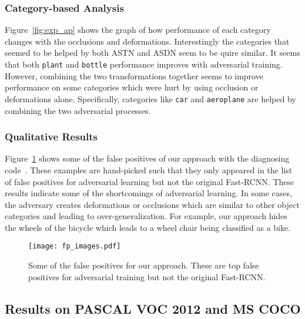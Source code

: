\documentclass[10pt,twocolumn,letterpaper]{article}
\begin{document}
\vspace{-0.1in}
\subsubsection{Category-based Analysis}
\vspace{-0.05in}
Figure~\ref{fig:exp_ap} shows the graph of how performance of each category changes with the occlusions and deformations. Interestingly the categories that seemed to be helped by both ASTN and ASDN seem to be quire similar. It seems that both {\tt plant} and {\tt bottle} performance improves with adversarial training. However, combining the two transformations together seems to improve performance on some categories which were hurt by using occlusion or deformations alone. Specifically, categories like {\tt car} and {\tt aeroplane} are helped by combining the two adversarial processes.



\subsubsection{Qualitative Results}
\vspace{-0.05in}
Figure~\ref{fig:exp_fp} shows some of the false positives of our approach with the diagnosing code~\cite{hoiem12}. These examples are hand-picked such that they only appeared in the list of false positives for adversarial learning but not the original Fast-RCNN. These results indicate some of the shortcomings of adversarial learning. In some cases, the adversary creates deformations or occlusions which are similar to other object categories and leading to over-generalization. For example, our approach hides the wheels of the bicycle which leads to a wheel chair being classified as a bike. 




\begin{figure}
    \centering
    \texttt{[image: fp\_images.pdf]}
    \vspace{-0.1in}
    \caption{Some of the false positives for our approach. These are top false positives for adversarial training but not the original Fast-RCNN.}\label{fig:exp_fp}
    \vspace{-0.15in}
\end{figure}



\subsection{Results on PASCAL VOC 2012 and MS COCO}
\end{document}
